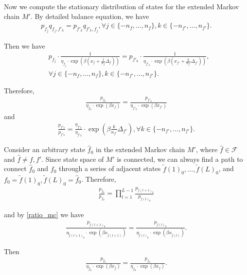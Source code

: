 \documentclass[10pt,conference]{IEEEtran}
\begin{document}
Now we compute the stationary distribution of states for the
extended Markov chain $M'$. By detailed balance equation, we have
\begin{align}
p_{f_j}q_{f_j,f'_k}=p_{f'_k}q_{f'_k,f_j}, \forall j \in
\{-n_f,\ldots,n_f\}, k \in \{-n_{f'},\ldots,n_{f'}\}.
\end{align}

Then we have
\begin{align}
& p_{f_j}\cdot \frac{1}{\eta_{f_j} \cdot
\exp(\beta(x_f+\frac{j}{n_f}\Delta_f))} = p_{f'_k}\cdot
\frac{1}{\eta_{f'_k} \cdot \exp(\beta
(x_{f'}+\frac{k}{n_{f'}}\Delta_{f'}))}, \\ & \forall j \in
\{-n_f,\ldots,n_f\}, k \in \{-n_{f'},\ldots,n_{f'}\}. \nonumber
\end{align}

Therefore,
\begin{align}
\label{ratio_mc} \frac{p_{f_0}}{\eta_{f_0} \cdot \exp(\beta
x_f)}=\frac{p_{f'_0}}{\eta_{f'_0} \cdot \exp(\beta x_{f'})}
\end{align}
and
\begin{align}
\label{ratio_error}
\frac{p_{f'_k}}{p_{f'_0}}=\frac{\eta_{f'_k}}{\eta_{f'_0}} \cdot
\exp(\beta \frac{k}{n_{f'}} \Delta_{f'}), \forall k \in
\{-n_{f'},\ldots,n_{f'}\}.
\end{align}

Consider an arbitrary state $\hat{f}_0$ in the extended Markov chain
$M'$, where $\hat{f} \in \mathcal{F}$ and $\hat{f}\neq f,f'$. Since
state space of $M'$ is connected, we can always find a path to
connect $\hat{f}_0$ and $f_0$ through a series of adjacent states
$\tilde{f}(1)_0,\ldots,\tilde{f}(L)_0$, and $f_0=\tilde{f}(1)_0,
\tilde{f}(L)_0=\hat{f}_0$. Therefore,
\begin{align}
\frac{p_{\hat{f}_0}}{p_{f_0}}=\prod_{l=1}^{L-1}\frac{p_{\tilde{f}(l+1)_0}}{p_{\tilde{f}(l)_0}}
\end{align}

and by \eqref{ratio_mc} we have
\begin{align}
\frac{p_{\tilde{f}(l+1)_0}}{\eta_{\tilde{f}(l+1)_0} \cdot \exp(\beta
x_{\tilde{f}(l+1)})}=\frac{p_{\tilde{f}(l)_0}}{\eta_{\tilde{f}(l)_0}
\cdot \exp(\beta x_{\tilde{f}(l)})}.
\end{align}

Then
\begin{align}
\label{ratio_mc2} \frac{p_{\hat{f}_0}}{\eta_{\hat{f}_0} \cdot
\exp(\beta x_{\hat{f}})}=\frac{p_{f_0}}{\eta_{f_0} \cdot \exp(\beta
x_f)}.
\end{align}
\end{document}

